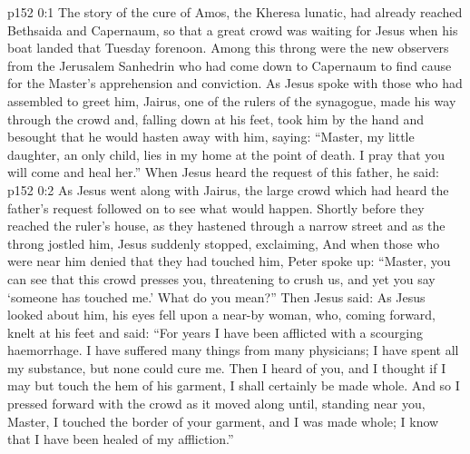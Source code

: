 \author{Midwayer Commission}
\vs p152 0:1 The story of the cure of Amos, the Kheresa lunatic, had already reached Bethsaida and Capernaum, so that a great crowd was waiting for Jesus when his boat landed that Tuesday forenoon. Among this throng were the new observers from the Jerusalem Sanhedrin who had come down to Capernaum to find cause for the Master’s apprehension and conviction. As Jesus spoke with those who had assembled to greet him, Jairus, one of the rulers of the synagogue, made his way through the crowd and, falling down at his feet, took him by the hand and besought that he would hasten away with him, saying: “Master, my little daughter, an only child, lies in my home at the point of death. I pray that you will come and heal her.” When Jesus heard the request of this father, he said: 
\vs p152 0:2 As Jesus went along with Jairus, the large crowd which had heard the father’s request followed on to see what would happen. Shortly before they reached the ruler’s house, as they hastened through a narrow street and as the throng jostled him, Jesus suddenly stopped, exclaiming,  And when those who were near him denied that they had touched him, Peter spoke up: “Master, you can see that this crowd presses you, threatening to crush us, and yet you say ‘someone has touched me.’ What do you mean?” Then Jesus said:  As Jesus looked about him, his eyes fell upon a near\hyp{}by woman, who, coming forward, knelt at his feet and said: “For years I have been afflicted with a scourging haemorrhage. I have suffered many things from many physicians; I have spent all my substance, but none could cure me. Then I heard of you, and I thought if I may but touch the hem of his garment, I shall certainly be made whole. And so I pressed forward with the crowd as it moved along until, standing near you, Master, I touched the border of your garment, and I was made whole; I know that I have been healed of my affliction.”
